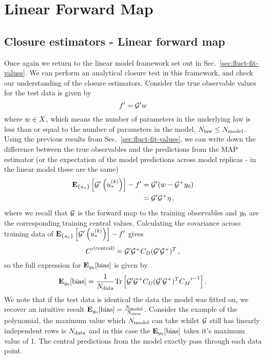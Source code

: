 \section{Linear Forward Map}

\subsection{Closure estimators - Linear forward map}

Once again we return to the linear model framework set out in
Sec.~\ref{sec:fluct-fit-values}. We can perform an analytical closure
test in this framework, and check our
understanding of the closure estimators. Consider the true observable
values for the test data is given by
\begin{equation}\label{eq:LinearLawMap}
    {{f}^{\prime}} = {{\mathcal{G}}^{\prime}} w
\end{equation}
where $w \in X$, which means the number of parameters
in the underlying law is less than or equal to the number of parameters in the
model, $N_{\rm law} \leq N_{\rm model}$. Using the previous results from
Sec.~\ref{sec:fluct-fit-values}, we can write down the
difference between the true observables and the predictions from the MAP estimator
(or the expectation of the model predictions across model replicas - in the
linear model these are the same)
\begin{equation}
    \begin{split}
        \mathbf{E}_{\{ u_* \}} \left[ {{\mathcal{G}}^{\prime}}\left(u_*^{(k)}\right) \right] - {{f}^{\prime}} &=
        {{\mathcal{G}}^{\prime}} (w - \mathcal{G}^+ y_0 ) \\
        &= {{\mathcal{G}}^{\prime}} \mathcal{G}^+ \eta \, ,
    \end{split}
\end{equation}
where we recall that $\mathcal{G}$ is the forward map to the training observables
and $y_0$ are
the corresponding training central values. Calculating the covariance across
training data of
$\mathbf{E}_{\{ u_* \}} \left[ {{\mathcal{G}}^{\prime}}\left(u_*^{(k)}\right) \right] - {{f}^{\prime}}$
gives
\begin{equation}
    {{C}^{\prime}}^{(\rm central)} = {{\mathcal{G}}^{\prime}} \mathcal{G}^+ C_{D} ({{\mathcal{G}}^{\prime}} \mathcal{G}^+)^T \, ,
\end{equation}
so the full expression for $\mathbf{E}_{y_0}[{\rm bias}]$ is given by
\begin{equation}
    \mathbf{E}_{y_0}[{\rm bias}] = \frac{1}{N_{\rm data}}
    {\rm Tr} \left[
        {{\mathcal{G}}^{\prime}} \mathcal{G}^+ C_{D} ({{\mathcal{G}}^{\prime}} \mathcal{G}^+)^T
        {{C_M}^{\prime}}^{-1}
    \right].
\end{equation}
We note that if the test data is identical the data the model was fitted on,
we recover an intuitive result $\mathbf{E}_{y_0}[{\rm bias}] = \frac{N_{\rm model}}{N_{\rm data}}$.
Consider the example of the polynomial, the maximum value which $N_{\rm model}$ can
take whilst $\mathcal{G}$ still has linearly independent rows is $N_{\rm data}$ and in this case
the $\mathbf{E}_{y_0}[{\rm bias}]$ takes it's maximum value of 1. The central
predictions from the model exactly pass through each data point.

